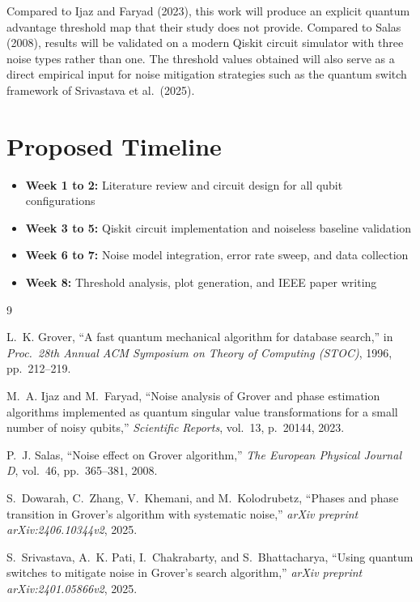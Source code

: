 \documentclass[12pt, a4paper]{article}
\begin{document}
Compared to Ijaz and Faryad (2023), this work will produce an explicit quantum
advantage threshold map that their study does not provide. Compared to Salas (2008),
results will be validated on a modern Qiskit circuit simulator with three noise
types rather than one. The threshold values obtained will also serve as a direct
empirical input for noise mitigation strategies such as the quantum switch framework
of Srivastava et al.\ (2025).

\section{Proposed Timeline}

\begin{itemize}
  \item \textbf{Week 1 to 2:} Literature review and circuit design for all qubit
        configurations
  \item \textbf{Week 3 to 5:} Qiskit circuit implementation and noiseless baseline
        validation
  \item \textbf{Week 6 to 7:} Noise model integration, error rate sweep, and data
        collection
  \item \textbf{Week 8:} Threshold analysis, plot generation, and IEEE paper writing
\end{itemize}

\begin{thebibliography}{9}

L.~K. Grover, ``A fast quantum mechanical algorithm for database search,''
in \textit{Proc.\ 28th Annual ACM Symposium on Theory of Computing (STOC)},
1996, pp.\ 212--219.

M.~A. Ijaz and M.~Faryad, ``Noise analysis of Grover and phase estimation
algorithms implemented as quantum singular value transformations for a small
number of noisy qubits,'' \textit{Scientific Reports}, vol.~13, p.~20144, 2023.

P.~J. Salas, ``Noise effect on Grover algorithm,''
\textit{The European Physical Journal D}, vol.~46, pp.~365--381, 2008.

S.~Dowarah, C.~Zhang, V.~Khemani, and M.~Kolodrubetz,
``Phases and phase transition in Grover's algorithm with systematic noise,''
\textit{arXiv preprint arXiv:2406.10344v2}, 2025.

S.~Srivastava, A.~K. Pati, I.~Chakrabarty, and S.~Bhattacharya,
``Using quantum switches to mitigate noise in Grover's search algorithm,''
\textit{arXiv preprint arXiv:2401.05866v2}, 2025.

\end{thebibliography}
\end{document}

